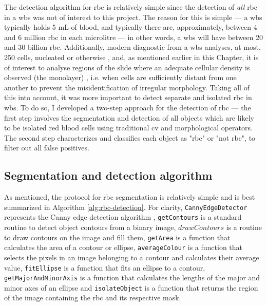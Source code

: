 The detection algorithm for \ac{rbc} is relatively simple since the detection of \textit{all} \ac{rbc} in a \ac{wbs} was not of interest to this project. The reason for this is simple --- a \ac{wbs} typically holds 5 mL of blood, and typically there are, approximately, between 4 and 6 million \ac{rbc} in each microlitre \cite{Bain2004-uq} --- in other words, a \ac{wbs} will have between 20 and 30 billion \ac{rbc}. Additionally, modern diagnostic from a \ac{wbs} analyses, at most, 250 cells, nucleated or otherwise \cite{Bain2005-zg}, and, as mentioned earlier in this Chapter, it is of interest to analyse regions of the slide where an adequate cellular density is observed (the monolayer) \cite{Adewoyin2014-vo}, i.e. when cells are sufficiently distant from one another to prevent the misidentification of irregular morphology. Taking all of this into account, it was more important to detect separate and isolated \ac{rbc} in \ac{wbs}. To do so, I developed a two-step approach for the detection of \ac{rbc} --- the first step involves the segmentation and detection of all objects which are likely to be isolated red blood cells using traditional \ac{cv} and morphological operators. The second step characterizes and classifies each object as "\ac{rbc}" or "not \ac{rbc}", to filter out all false positives.

\subsection{Segmentation and detection algorithm}

As mentioned, the protocol for \ac{rbc} segmentation is relatively simple and is best summarized in Algorithm \ref{alg:rbc-detection}. For clarity, \texttt{CannyEdgeDetector} represents the Canny edge detection algorithm \cite{Canny1986-pi}, \texttt{getContours} is a standard routine to detect object contours from a binary image, $drawContours$ is a routine to draw contours on the image and fill them, \texttt{getArea} is a function that calculates the area of a contour or ellipse, \texttt{averageColour} is a function that selects the pixels in an image belonging to a contour and calculates their average value, \texttt{fitEllipse} is a function that fits an ellipse to a contour, \texttt{getMajorAndMinorAxis} is a function that calculates the lengths of the major and minor axes of an ellipse and \texttt{isolateObject} is a function that returns the region of the image containing the \ac{rbc} and its respective mask. 

